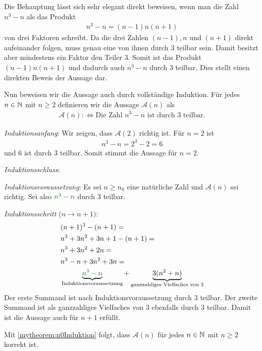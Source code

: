 \clearpage
\begin{myanswer}[myexercise:0205]
	Die Behauptung lässt sich sehr elegant direkt beweisen, wenn man die Zahl $n^3-n$ als das Produkt
	\begin{align*}
		n^3-n = (n-1)n(n+1)
	\end{align*}
	von drei Faktoren schreibt. Da die drei Zahlen $(n-1), n$ und $(n+1)$ direkt aufeinander folgen, muss genau eine von ihnen durch $3$ teilbar sein. Damit besitzt aber mindestens ein Faktor den Teiler $3$. Somit ist das Produkt $(n-1)n(n+1)$ und dadurch auch $n^3-n$ durch $3$ teilbar. Dies stellt einen direkten Beweis der Aussage dar.

	Nun beweisen wir die Aussage auch durch vollständige Induktion. Für jedes $n\in\mathbb{N}$ mit $n\geq 2$ definieren wir die Aussage $\mathcal{A}(n)$ als
	\begin{align*}
		\mathcal{A}(n) :\iff \text{Die Zahl } n^3-n \text{ ist durch $3$ teilbar}.
	\end{align*}
	\begin{aenum}
		\item \textit{Induktionsanfang}: Wir zeigen, dass $\mathcal{A}(2)$ richtig ist. Für $n=2$ ist
		\begin{align*}
			n^3-n = 2^3-2 = 6
		\end{align*}
		und $6$ ist durch $3$ teilbar. Somit stimmt die Aussage für $n=2$.
		\item \textit{Induktionsschluss}:
		\begin{renum}
			\item \textit{Induktionsvoraussetzung}: Es sei $n\geq n_0$ eine natürliche Zahl und $\mathcal{A}(n)$ sei richtig. Sei also $\textcolor{Green}{n^3-n}$ durch $3$ teilbar.
			\item \textit{Induktionsschritt} ($n\to n+1)$:
				\begin{align*}
					 & (n+1)^3-(n+1) =                                                                                                                       \\
					 & n^3+3n^2+3n+1 - (n+1) =                                                                                                               \\
					 & n^3+3n^2+2n =                                                                                                                         \\
					 & n^3-n+3n^2+3n =                                                                                                                       \\
					 & \underbrace{\textcolor{Green}{n^3-n}}_{\text{Induktionsvoraussetzung}}+\underbrace{3(n^2+n)}_{\text{ganzzahliges Vielfaches von $3$}}
				\end{align*}
				Der erste Summand ist nach Induktionsvoraussetzung durch $3$ teilbar. Der zweite Summand ist als ganzzahliges Vielfaches von $3$ ebenfalls durch $3$ teilbar. Damit ist die Aussage auch für $n+1$ erfüllt.
		\end{renum}
	\end{aenum}
	Mit \cref{mytheorem:n0Induktion} folgt, dass $\mathcal{A}(n)$ für jedes $n\in\mathbb{N}$ mit $n\geq 2$ korrekt ist.
\end{myanswer}

